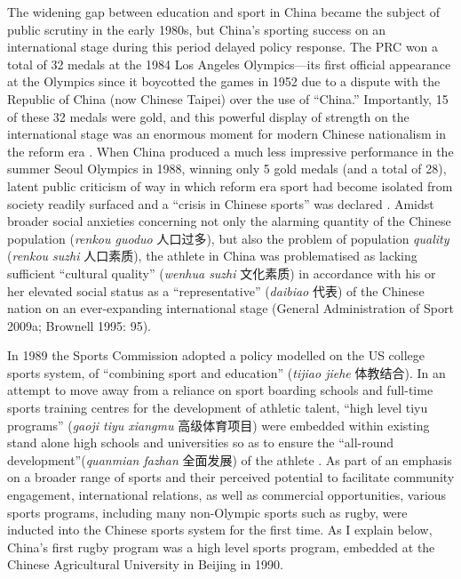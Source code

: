 \begin{CJK}{UTF8}{gbsn}
The widening gap between education and sport in China became the subject of public scrutiny in the early 1980s, but China's sporting success on an international stage during this period delayed policy response.  The PRC won a total of 32 medals at the 1984 Los Angeles Olympics---its first official appearance at the Olympics since it boycotted the games in 1952 due to a dispute with the Republic of China (now Chinese Taipei) over the use of ``China.''  Importantly, 15 of these 32 medals were gold, and this powerful display of strength on the international stage was an enormous moment for modern Chinese nationalism in the reform era \citep{Brownell2008}.  When China produced a much less impressive performance in the summer Seoul Olympics in 1988, winning only 5 gold medals (and a total of 28), latent public criticism of way in which reform era sport had become isolated from society readily surfaced and a ``crisis in Chinese sports'' was declared \citep[199]{Brownell1995}.  Amidst broader social anxieties concerning not only the alarming quantity of the Chinese population (\textit{renkou guoduo} 人口过多), but also the problem of population \textit{quality} (\textit{renkou suzhi} 人口素质), the athlete in China was problematised as lacking sufficient ``cultural quality'' (\textit{wenhua suzhi} 文化素质) in accordance with his or her elevated social status as a ``representative'' (\textit{daibiao} 代表) of the Chinese nation on an ever-expanding international stage (General Administration of Sport 2009a; Brownell 1995: 95).

In 1989 the Sports Commission adopted a policy modelled on the US college sports system, of ``combining sport and education'' (\textit{tijiao jiehe} 体教结合).  In an attempt to move away from a reliance on sport boarding schools and full-time sports training centres for the development of athletic talent, ``high level tiyu programs'' (\textit{gaoji tiyu xiangmu} 高级体育项目) were embedded within existing stand alone high schools and universities so as to ensure the ``all-round development''(\textit{quanmian fazhan} 全面发展) of the athlete \citep[203]{Brownell1995}.  As part of an emphasis on a broader range of sports and their perceived potential to facilitate community engagement, international relations, as well as commercial opportunities, various sports programs, including many non-Olympic sports such as rugby, were inducted into the Chinese sports system for the first time\citep[70]{Knuttgen1990}.  As I explain below, China's first rugby program was a high level sports program, embedded at the Chinese Agricultural University in Beijing in 1990.


\end{CJK}
